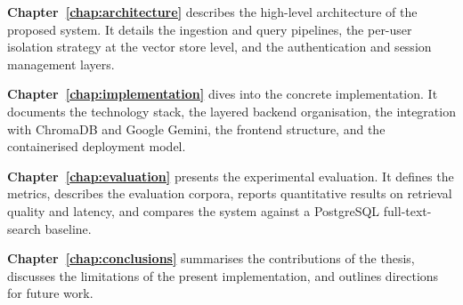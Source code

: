 \textbf{Chapter~\ref{chap:architecture}} describes the high-level architecture
of the proposed system. It details the ingestion and query pipelines, the
per-user isolation strategy at the vector store level, and the authentication
and session management layers.

\textbf{Chapter~\ref{chap:implementation}} dives into the concrete
implementation. It documents the technology stack, the layered backend
organisation, the integration with ChromaDB and Google Gemini, the frontend
structure, and the containerised deployment model.

\textbf{Chapter~\ref{chap:evaluation}} presents the experimental evaluation.
It defines the metrics, describes the evaluation corpora, reports quantitative
results on retrieval quality and latency, and compares the system against a
PostgreSQL full-text-search baseline.

\textbf{Chapter~\ref{chap:conclusions}} summarises the contributions of the
thesis, discusses the limitations of the present implementation, and outlines
directions for future work.
